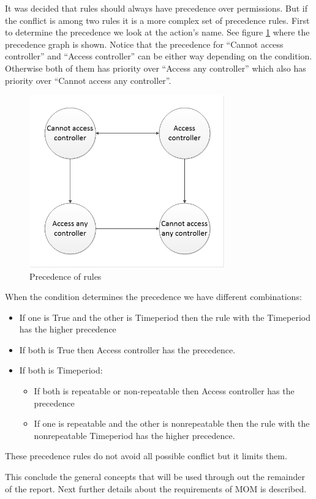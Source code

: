 It was decided that rules should always have precedence over permissions. But if the conflict is among two rules it is a more complex set of precedence rules. First to determine the precedence we look at the action's name. See figure \ref{fig:precendence} where the precedence graph is shown. Notice that the precedence for ``Cannot access controller'' and ``Access controller'' can be either way depending on the condition. Otherwise both of them has priority over ``Access any controller'' which also has priority over ``Cannot access any controller''. 
  
\begin{figure}
	\centering
		\includegraphics[width=0.75\textwidth]{images/precendence.jpg}
	\caption{Precedence of rules}
	\label{fig:precendence}
\end{figure}

When the condition determines the precedence we have different combinations:

\begin{itemize}
	\item If one is True and the other is Timeperiod then the rule with the Timeperiod has the higher precedence
	\item If both is True then Access controller has the precedence.
	\item If both is Timeperiod:
		\begin{itemize}
			\item If both is repeatable or non-repeatable%
			then Access controller has the precedence
			\item If one is repeatable and the other is nonrepeatable then the rule with the nonrepeatable Timeperiod has the higher precedence.
		\end{itemize}
\end{itemize}

These precedence rules do not avoid all possible conflict but it limits them.  


This conclude the general concepts that will be used through out the remainder of the report. Next further details about the requirements of MOM is described.